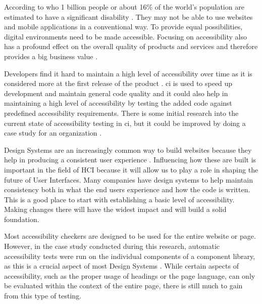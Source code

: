 \documentclass{master_thesis}
\begin{document}

According to \ac{who} 1 billion people or about 16\% of the world's population are estimated to have a significant disability \citep{WHO2022}. They may not be able to use websites and mobile applications in a conventional way. To provide equal possibilities, digital environments need to be made accessible. Focusing on accessibility also has a profound effect on the overall quality of products and services and therefore provides a big business value \citep{Miesenberger2020}.

Developers find it hard to maintain a high level of accessibility over time as it is considered more at the first release of the product \citep{Paterno2020}. \ac{ci} is used to speed up development and maintain general code quality \citep{Zhao2017} and it could also help in maintaining a high level of accessibility by testing the added code against predefined accessibility requirements. There is some initial research into the current state of accessibility testing in \ac{ci}, but it could be improved by doing a case study for an organization \citep{Sane2021, KelseyAdkins2022}.

Design Systems are an increasingly common way to build websites because they help in producing a consistent user experience \citep{Yew2020}. Influencing how these are built is important in the field of HCI because it will allow us to play a role in shaping the future of User Interfaces. Many companies have design systems to help maintain consistency both in what the end users experience and how the code is written. This is a good place to start with establishing a basic level of accessibility. Making changes there will have the widest impact and will build a solid foundation.

Most accessibility checkers are designed to be used for the entire website or page. However, in the case study conducted during this research, automatic accessibility tests were run on the individual components of a component library, as this is a crucial aspect of most Design Systems \citep{Yew2020}. While certain aspects of accessibility, such as the proper usage of headings or the page language, can only be evaluated within the context of the entire page, there is still much to gain from this type of testing.
\end{document}

